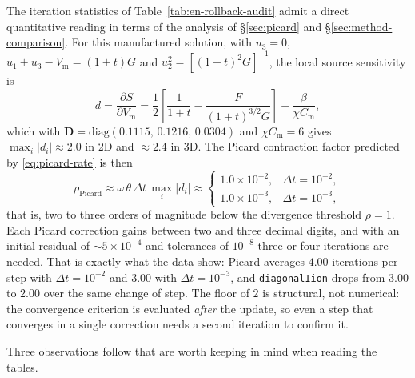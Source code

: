 \documentclass[11pt,a4paper]{article}
\newcommand{\code}[1]{\texttt{\small #1}}
\newcommand{\Vm}{V_{\text{m}}}
\newcommand{\Dten}{\mathbf{D}}
\begin{document}
The iteration statistics of Table~\ref{tab:en-rollback-audit} admit a direct
quantitative reading in terms of the analysis of \S\ref{sec:picard} and
\S\ref{sec:method-comparison}. For this manufactured solution, with $u_3=0$,
$u_1+u_3-\Vm=(1+t)G$ and $u_2^2=[(1+t)^2G]^{-1}$, the local source sensitivity
is
\begin{equation}
  d=\frac{\partial S}{\partial \Vm}
  =
  \frac{1}{2}\left[\frac{1}{1+t}-\frac{F}{(1+t)^{3/2}G}\right]
  -\frac{\beta}{\chi C_{\text{m}}},
  \label{eq:d-analytic}
\end{equation}
which with $\Dten=\mathrm{diag}(0.1115,\,0.1216,\,0.0304)$ and
$\chi C_{\text{m}}=6$ gives $\max_i|d_i|\approx 2.0$ in 2D and $\approx 2.4$ in
3D. The Picard contraction factor predicted by \eqref{eq:picard-rate} is then
\begin{equation}
  \rho_{\text{Picard}}\approx\omega\,\theta\,\Delta t\,\max_i|d_i|
  \approx
  \begin{cases}
    1.0\times10^{-2}, & \Delta t=10^{-2},\\
    1.0\times10^{-3}, & \Delta t=10^{-3},
  \end{cases}
  \label{eq:rho-numeric}
\end{equation}
that is, two to three orders of magnitude below the divergence threshold
$\rho=1$. Each Picard correction gains between two and three decimal digits, and
with an initial residual of $\sim\!5\times10^{-4}$ and tolerances of $10^{-8}$
three or four iterations are needed. That is exactly what the data show: Picard
averages $4.00$ iterations per step with $\Delta t=10^{-2}$ and $3.00$ with
$\Delta t=10^{-3}$, and \code{diagonalIion} drops from $3.00$ to $2.00$ over the
same change of step. The floor of $2$ is structural, not numerical: the
convergence criterion is evaluated \emph{after} the update, so even a step that
converges in a single correction needs a second iteration to confirm it.

Three observations follow that are worth keeping in mind when reading the
tables.
\end{document}
